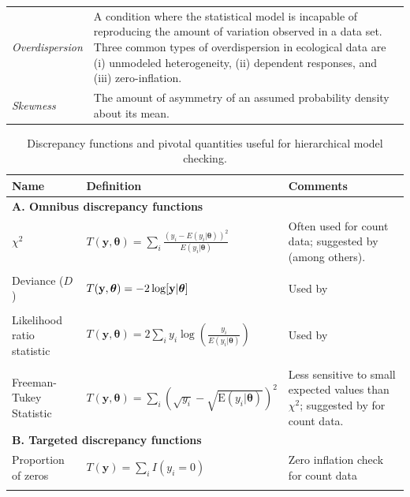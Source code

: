 \documentclass[12pt,english]{article}
\begin{document}
\begin{spacing}{1.9}
\begin{table}[htp]
\begin{tabular}{p{3cm}p{13cm}}
        \textit{Overdispersion} & A condition where the statistical model is incapable of reproducing the amount of variation observed in a data set.  Three common types of overdispersion in ecological data are (i) unmodeled heterogeneity, (ii) dependent responses, and (iii) zero-inflation. \\
        \textit{Skewness} & The amount of asymmetry of an assumed probability density about its mean.   \\
        \hline
      \end{tabular}
    \end{table}

 \pagebreak


    \begin{table}[htp]
      \caption{Discrepancy functions and pivotal quantities useful for hierarchical model checking.
      }
      \label{tab:discrepancy}
      \centering
      \begin{tabular}{p{4cm}lp{5cm}}
        \hline
        Name & Definition & Comments \\
        \hline
        \multicolumn{3}{l}{\textbf{A. Omnibus discrepancy functions}} \\
        $\chi^2$ & $T(\textbf{y},\boldsymbol{\theta}) = \sum_i \frac{(y_i - E(y_i|\boldsymbol{\theta}))^2}{E(y_i|\boldsymbol{\theta})}$ & Often used for count data; suggested by \citet{GelmanEtAl2014} (among others).\\
        & & \\
        Deviance ($D$) &  $T(\textbf{y},\boldsymbol{\theta}) = -2 \log [{\bf y} | \boldsymbol{\theta}]$ & Used by \citet{KingEtAl2009}\\
        & & \\
        Likelihood ratio statistic & $T(\textbf{y},\boldsymbol{\theta}) = 2 \sum_i y_i \log(\frac{y_i}{E(y_i|\boldsymbol{\theta})})$ & Used by \citet{LunnEtAl2013} \\
        & & \\
        Freeman-Tukey Statistic & $T(\textbf{y},\boldsymbol{\theta})=\sum_i (\sqrt{y_i}-\sqrt{\textrm{E}(y_i|\boldsymbol{\theta})})^2$ & Less sensitive to small expected values than $\chi^2$; suggested by \citet{KeryRoyle2016} for count data.\\
        \multicolumn{3}{l}{\textbf{B. Targeted discrepancy functions}} \\
        Proportion of zeros & $T(\textbf{y}) = \sum_i I(y_i = 0) $ & Zero inflation check for count data \\
        & & \\

\end{tabular}
\end{table}
\end{spacing}
\end{document}

